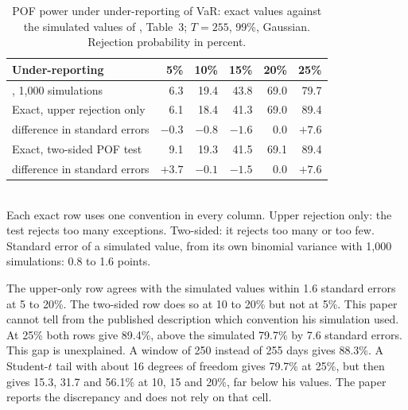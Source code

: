 \documentclass[11pt]{article}
\begin{document}
\begin{table}[H]
\caption{POF power under under-reporting of VaR: exact values against the
simulated values of \citet{campbell2005}, Table~3; $T = 255$, 99\%, Gaussian.
Rejection probability in percent.}
\label{tab:campbell}
\small
\centering
\begin{tabular}{lrrrrr}
\toprule
Under-reporting & 5\% & 10\% & 15\% & 20\% & 25\% \\
\midrule
\citet{campbell2005}, 1,000 simulations & 6.3 & 19.4 & 43.8 & 69.0 & 79.7 \\
Exact, upper rejection only & 6.1 & 18.4 & 41.3 & 69.0 & 89.4 \\
\quad difference in standard errors & $-0.3$ & $-0.8$ & $-1.6$ & 0.0 & $+7.6$ \\
Exact, two-sided POF test & 9.1 & 19.3 & 41.5 & 69.1 & 89.4 \\
\quad difference in standard errors & $+3.7$ & $-0.1$ & $-1.5$ & 0.0 & $+7.6$ \\
\bottomrule
\end{tabular}
\\[2pt]
\footnotesize Each exact row uses one convention in every column. Upper
rejection only: the test rejects too many exceptions. Two-sided: it rejects too
many or too few. Standard error of a simulated value, from its own binomial
variance with 1,000 simulations: 0.8 to 1.6 points.
\end{table}

The upper-only row agrees with the simulated values within 1.6 standard errors
at 5 to 20\%. The two-sided row does so at 10 to 20\% but not at 5\%. This
paper cannot tell from the published description which convention his
simulation used. At 25\% both rows give 89.4\%, above the simulated 79.7\% by
7.6 standard errors. This gap is unexplained. A window of 250 instead of 255
days gives 88.3\%. A Student-$t$ tail with about 16 degrees of freedom gives
79.7\% at 25\%, but then gives 15.3, 31.7 and 56.1\% at 10, 15 and 20\%, far
below his values. The paper reports the discrepancy and does not rely on that
cell.


\end{document}
